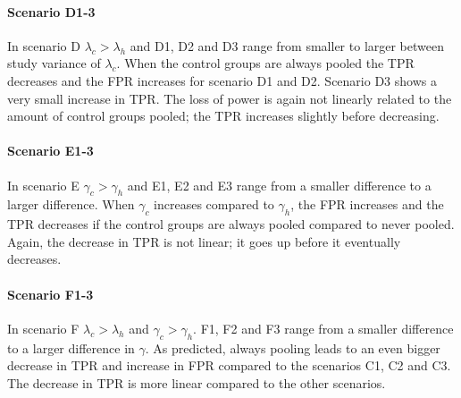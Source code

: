 \documentclass[Royal,sagev,times]{sagej}
\begin{document}
\paragraph{Scenario D1-3}
In scenario D $\lambda_{c} > \lambda_{h}$ and D1, D2 and D3 range from smaller to larger between study variance of $\lambda_{c}$.  When the control groups are always pooled the TPR decreases and the FPR increases for scenario D1 and D2. Scenario D3 shows a very small increase in TPR. The loss of power is again not linearly related to the amount of control groups pooled; the TPR increases slightly before decreasing. 

\paragraph{Scenario E1-3}
In scenario E $\gamma_{c} > \gamma_{h}$ and E1, E2 and E3 range from a smaller difference to a larger difference. When $\gamma_{c}$ increases compared to $\gamma_{h}$, the FPR increases and the TPR decreases if the control groups are always pooled compared to never pooled. Again, the decrease in TPR is not linear; it goes up before it eventually decreases. 

\paragraph{Scenario F1-3}
In scenario F $\lambda_{c} > \lambda_{h}$ and $\gamma_{c} > \gamma_{h}$. F1, F2 and F3 range from a smaller difference to a larger difference in $\gamma$. As predicted, always pooling leads to an even bigger decrease in TPR and increase in FPR compared to the scenarios C1, C2 and C3. The decrease in TPR is more linear compared to the other scenarios.
\end{document}

